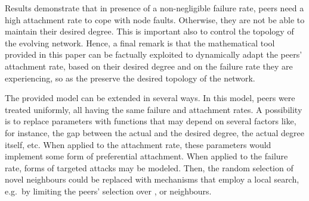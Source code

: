 \documentclass[a4paper,twosided]{article}
\begin{document}
Results demonstrate that in presence of a non-negligible failure rate, peers need a high attachment rate to cope with node faults. Otherwise, they are not be able to maintain their desired degree. This is important also to control the topology of the evolving network.
Hence, a final remark is that the mathematical tool provided in this paper can be factually exploited to dynamically adapt the peers' attachment rate, based on their desired degree and on the failure rate they are experiencing, so as the preserve the desired topology of the network.

The provided model can be extended in several ways. 
In this model, peers were treated uniformly, all having the same failure and attachment rates. 
A possibility is to replace  parameters with functions that may depend on several factors like, for instance, the gap between the actual and the desired degree, the actual degree itself, etc. When applied to the attachment rate, these parameters would implement some form of preferential attachment. When applied to the failure rate, forms of targeted attacks may be modeled.
Then, the random selection of novel neighbours could be replaced with mechanisms that employ a local search, e.g.~by limiting the peers' selection over , or  neighbours. 















\end{document}
